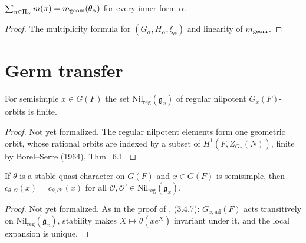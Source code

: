 \begin{proposition}[Thesis (6.7.2)]
\label{packet_sum_mult}
\leanok
{}
$\sum_{\pi\in\Pi_\alpha}m(\pi)=m_{\mathrm{geom}}(\theta_\alpha)$ for every inner form $\alpha$.
\end{proposition}
\begin{proof}
\leanok
{}
The multiplicity formula for $(G_\alpha,H_\alpha,\xi_\alpha)$ and linearity of $m_{\mathrm{geom}}$.
\end{proof}

\section{Germ transfer}
\begin{lemma}
\label{finite_nilReg}
\leanok
{}
For semisimple $x\in G(F)$ the set $\mathrm{Nil}_{\mathrm{reg}}(\mathfrak g_x)$ of regular nilpotent
$G_x(F)$-orbits is finite.
\end{lemma}
\begin{proof}
Not yet formalized. The regular nilpotent elements form one geometric orbit, whose rational orbits are
indexed by a subset of $H^1(F,Z_{G_x}(N))$, finite by Borel--Serre (1964), Thm.~6.1.
\end{proof}

\begin{lemma}
\label{germ_eq_germ_of_stable}
\leanok
{}
If $\theta$ is a stable quasi-character on $G(F)$ and $x\in G(F)$ is semisimple, then
$c_{\theta,\mathcal O}(x)=c_{\theta,\mathcal O'}(x)$ for all $\mathcal O,\mathcal O'\in\mathrm{Nil}_{\mathrm{reg}}(\mathfrak g_x)$.
\end{lemma}
\begin{proof}
Not yet formalized. As in the proof of \cite{BP}, (3.4.7): $G_{x,\mathrm{ad}}(F)$ acts transitively on
$\mathrm{Nil}_{\mathrm{reg}}(\mathfrak g_x)$, stability makes $X\mapsto\theta(xe^X)$ invariant under it, and the
local expansion is unique.
\end{proof}

